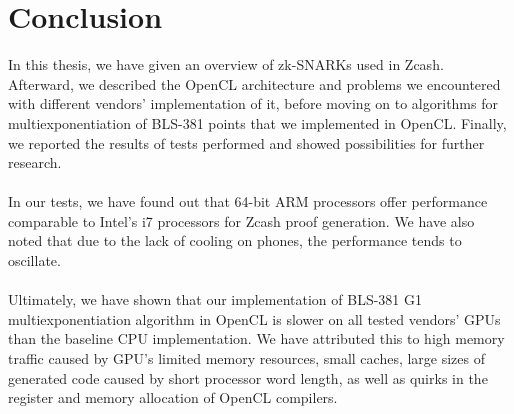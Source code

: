 
\chapter{Conclusion} %

\label{Chapter9} %


In this thesis, we have given an overview of zk-SNARKs used in Zcash. Afterward, we described the OpenCL architecture and problems we encountered with different vendors' implementation of it, before moving on to algorithms for multiexponentiation of BLS-381 points that we implemented in OpenCL. Finally, we reported the results of tests performed and showed possibilities for further research.\\
\\
In our tests, we have found out that 64-bit ARM processors offer performance comparable to Intel's i7 processors for Zcash proof generation. We have also noted that due to the lack of cooling on phones, the performance tends to oscillate.\\
\\
Ultimately, we have shown that our implementation of BLS-381 G1 multiexponentiation algorithm in OpenCL is slower on all tested vendors' GPUs than the baseline CPU implementation. We have attributed this to high memory traffic caused by GPU's limited memory resources, small caches, large sizes of generated code caused by short processor word length, as well as quirks in the register and memory allocation of OpenCL compilers.